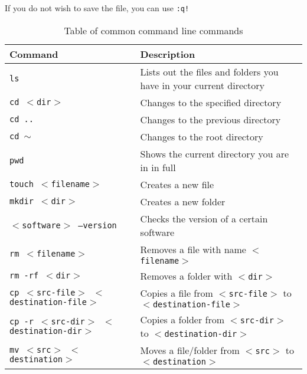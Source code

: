If you do not wish to save the file, you can use \texttt{:q!}

\begin{table}[H]
    \centering
    \caption{Table of common command line commands}
    \vspace{6mm}
    \begin{tabular}{|m{13em}|m{22em}|}
        \hline
        \textbf{Command} & 
        Description 
        \\ \hline \hline
        
        \texttt{ls} &
        Lists out the files and folders you have in your current directory
        \\ \hline
        
        \texttt{cd $<$dir$>$} &
        Changes to the specified directory
        \\ \hline
        
        \texttt{cd ..} &
        Changes to the previous directory
        \\ \hline
        
        \texttt{cd $\sim$} &
        Changes to the root directory
        \\ \hline
        
        \texttt{pwd} &
        Shows the current directory you are in in full
        \\ \hline
        
        \texttt{touch $<$filename$>$} &
        Creates a new file
        \\ \hline
        
        \texttt{mkdir $<$dir$>$} &
        Creates a new folder
        \\ \hline
        
        \texttt{$<$software$>$ --version} &
        Checks the version of a certain software
        \\ \hline
        
        \texttt{rm $<$filename$>$} &
        Removes a file with name \texttt{$<$filename$>$}
        \\ \hline
        
        \texttt{rm -rf $<$dir$>$} &
        Removes a folder with \texttt{$<$dir$>$}
        \\ \hline
        
        \texttt{cp $<$src-file$>$ $<$destination-file$>$} &
        Copies a file from \texttt{$<$src-file$>$} to \texttt{$<$destination-file$>$}
        \\ \hline
        
        \texttt{cp -r $<$src-dir$>$ $<$destination-dir$>$} &
        Copies a folder from \texttt{$<$src-dir$>$} to \texttt{$<$destination-dir$>$}
        \\ \hline
        
        \texttt{mv $<$src$>$ $<$destination$>$} &
        Moves a file/folder from \texttt{$<$src$>$} to \texttt{$<$destination$>$}
        \\ \hline
        
    \end{tabular}
\end{table}
